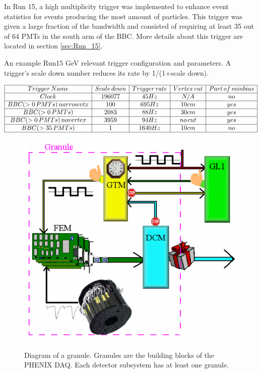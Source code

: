 In Run 15, a high multiplicity trigger was implemented to enhance event statistics for events producing the most amount of particles. This trigger was given a large fraction of the bandwidth and consisted of requiring at least 35 out of 64 PMTs in the south arm of the BBC. More details about this trigger are located in section \ref{sec:Run_15}.
\begin{table}[h!]
\centering
\caption{An example Run15  GeV relevant trigger configuration and parameters. A trigger's scale down number reduces its rate by 1/(1+scale down). }%
    $\begin{array}{|c|c|c|c|c|}
    \hline 
    Trigger\thinspace Name & Scale\thinspace down & Trigger\thinspace rate & Vertex\thinspace cut & Part\thinspace of\thinspace minbias \\ \hline
     Clock & 196077 & 45 Hz  & N/A & no \\ \hline
    BBC(>0\thinspace PMTs)\thinspace narrowvtx& 100 &  695 Hz &  10 cm & yes\\ \hline
    BBC(>0\thinspace PMTs)  & 2083 & 88 Hz &  30 cm & yes\\ \hline
    BBC(>0\thinspace PMTs)\thinspace novertex& 3959 &94 Hz  &no\thinspace cut & yes\\ \hline
    BBC(>35\thinspace  PMTs) & 1 & 1640 Hz &  10 cm & no \\ \hline
    \end{array}$
\end{table}

\begin{figure}[h!]
\begin{center}
\label{fig:granule_diag}
\includegraphics[width=0.55\linewidth]{figs/granule_diagram.png}
\caption{Diagram of a granule. Granules are the building blocks of the PHENIX DAQ. Each detector subsystem has at least one granule.} %
\end{center}
\end{figure}

